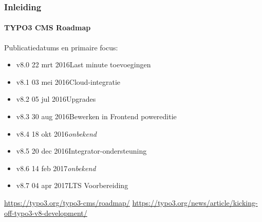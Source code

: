 \begin{frame}[fragile]
	\frametitle{Inleiding}
	\framesubtitle{TYPO3 CMS Roadmap}

	Publicatiedatums en primaire focus:

	\begin{itemize}

		\item v8.0 \tabto{1.1cm}22 mrt 2016\tabto{3.4cm}Last minute toevoegingen
		\item v8.1 \tabto{1.1cm}03 mei 2016\tabto{3.4cm}Cloud-integratie
		\item
			\begingroup
				\color{typo3orange}
					v8.2 \tabto{1.1cm}05 jul 2016\tabto{3.4cm}Upgrades
			\endgroup
		\item
			\begingroup
				\color{typo3orange}
					v8.3 \tabto{1.1cm}30 aug 2016\tabto{3.4cm}Bewerken in Frontend powereditie
			\endgroup
		\item v8.4 \tabto{1.1cm}18 okt 2016\tabto{3.4cm}\textit{onbekend}
		\item v8.5 \tabto{1.1cm}20 dec 2016\tabto{3.4cm}Integrator-ondersteuning
		\item v8.6 \tabto{1.1cm}14 feb 2017\tabto{3.4cm}\textit{onbekend}
		\item v8.7 \tabto{1.1cm}04 apr 2017\tabto{3.4cm}LTS Voorbereiding

	\end{itemize}

	\smaller
		\url{https://typo3.org/typo3-cms/roadmap/}\newline
		\url{https://typo3.org/news/article/kicking-off-typo3-v8-development/}
	\normalsize

\end{frame}

